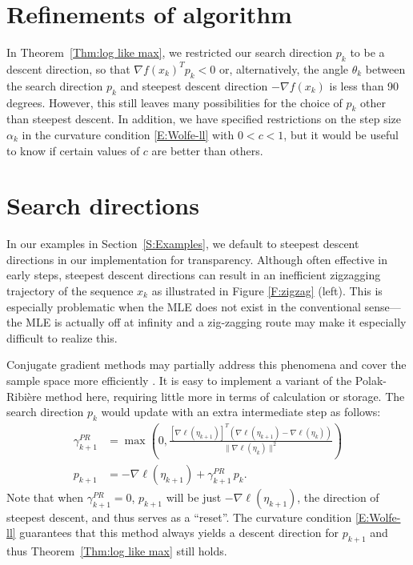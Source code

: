 \section{Refinements of algorithm}

In Theorem~\ref{Thm:log like max}, we restricted our search direction $p_k$ to be a 
descent direction, so that $\nabla f
(x_k)^T p_k < 0$ or, alternatively, the angle $\theta_k$ between the search direction 
$p_k$ and steepest descent 
direction $-\nabla f(x_k)$ is less than 90 degrees.  However, this still leaves many 
possibilities for the choice of 
$p_k$ other than steepest descent.  In addition, we have specified restrictions on the 
step size $\alpha_k$ in the 
curvature condition \eqref{E:Wolfe-ll} with $0 < c < 1$, but it would be useful to 
know if certain values of $c$ are 
better than others.

\section{Search directions}
In our examples in Section~\ref{S:Examples}, we default to steepest descent directions 
in our implementation for 
transparency.  Although often effective in early steps, steepest descent directions 
can result in an inefficient zigzagging 
trajectory of the sequence $x_k$ \citep{Sun:2006}  as 
illustrated in Figure 
\ref{F:zigzag} (left).  This is especially problematic when the MLE does not exist in the 
conventional sense---the MLE is actually off at infinity and a zig-zagging route may 
make it especially difficult to realize this.

Conjugate gradient methods may partially address 
this phenomena and cover the 
sample space more efficiently \citep{NW}.  It is easy to implement a variant of the 
Polak-Ribi\`{e}re method
\citep[pp.~120--122]{NW} here, requiring little more in terms of calculation or 
storage.  The search direction $p_k$ would update 
with an extra intermediate step as follows:
\begin{align*}
	\gamma_{k+1}^{PR} &= \max \left( 0, \frac{ [ \nabla \ell( \eta_{k+1}) ]^T( \nabla \ell( \eta_{k+1} ) - \nabla \ell( \eta_k) )  }
{ \lVert \nabla \ell( \eta_k) \rVert^2 } \right )\\
	p_{k+1} &= -\nabla \ell( \eta_{k+1}) + \gamma_{k+1}^{PR} \, p_k.
\end{align*}
Note that when $\gamma_{k+1}^{PR} = 0$, $p_{k+1}$ will be just $-\nabla \ell( \eta_{k+1})$, 
the direction of steepest 
descent, and thus serves as a ``reset''.  The curvature condition \eqref{E:Wolfe-ll} 
guarantees that this method always 
yields a descent direction for $p_{k+1}$ and thus Theorem~\ref{Thm:log like max} still 
holds.  

